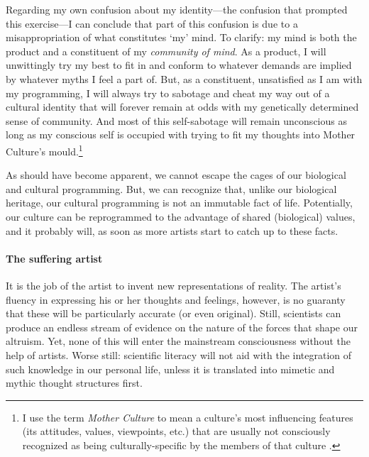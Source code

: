 \documentclass{article}
\begin{document}
Regarding my own confusion about my identity---the confusion that prompted this
exercise---I can conclude that part of this confusion is due to a misappropriation
of what constitutes ‘my’ mind. To clarify: my mind is both the product and a
constituent of my \emph{community of mind}. As a product, I will unwittingly
try my best to fit in and conform to whatever demands are implied by whatever
myths I feel a part of. But, as a constituent, unsatisfied as I am with my
programming, I will always try to sabotage and cheat my way out of a cultural
identity that will forever remain at odds with my genetically determined
sense of community. And most of this self-sabotage will remain unconscious as
long as my conscious self is occupied with trying to fit my thoughts into
Mother Culture's mould.\footnote{I use the term \emph{Mother Culture} to mean
a culture's most influencing features (its attitudes, values, viewpoints, etc.)
that are usually not consciously recognized as being culturally-specific by the
members of that culture \citep{quinn1992}.} 

As should have become apparent, we cannot escape the cages of our biological
and cultural programming. But, we can recognize that, unlike our biological
heritage, our cultural programming is not an immutable fact of life.
Potentially, our culture can be reprogrammed to the advantage of shared
(biological) values, and it probably will, as soon as more artists start to
catch up to these facts.

\paragraph{The suffering artist}

It is the job of the artist to invent new representations of reality. The artist's
fluency in expressing his or her thoughts and feelings, however, is no guaranty
that these will be particularly accurate (or even original). Still, scientists
can produce an endless stream of evidence on the nature of the forces that
shape our altruism. Yet, none of this will enter the mainstream consciousness
without the help of artists. Worse still: scientific literacy will not aid with
the integration of such knowledge in our personal life, unless it is translated
into mimetic and mythic thought structures first.
\end{document}
